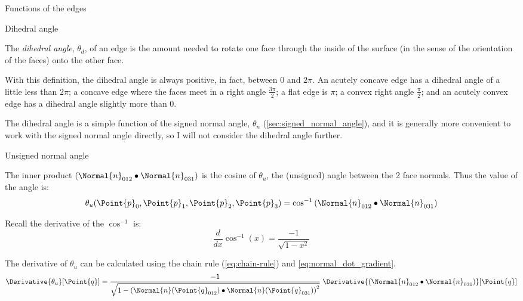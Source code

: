 \begin{plSection}{Functions of the edges}
\begin{plSection}{Dihedral angle}
\label{sec:Dihedral-angle}

The {\it dihedral angle},
$\theta_d$,
 of an edge is the amount
needed to rotate one face
through the inside of the surface
(in the sense of the orientation of the faces)
onto the other face.

With this definition, the dihedral angle is always
positive, in fact, between $0$ and $2\pi$.
An acutely concave edge has a dihedral angle
of a little less than $2\pi$;
a concave edge where the faces meet in a right angle
$\frac{3\pi}{2}$;
a flat edge is $\pi$;
a convex right angle $\frac{\pi}{2}$;
and an acutely convex edge has a dihedral angle
slightly more than $0$.

The dihedral angle is a simple function of the
signed normal angle, $\theta_n$
(\cref{sec:signed_normal_angle}),
and it is generally more convenient to work
with the signed normal angle directly,
so I will not consider the dihedral angle further.

\end{plSection}%

\begin{plSection}{Unsigned normal angle}
\label{sec:unsigned_normal_angle}

The inner product 
$\left( \Normal{n}_{012} \bullet \Normal{n}_{031} \right)$
is the cosine of $\theta_u$,
the (unsigned) angle between the 2 face normals.
Thus the value of the angle is:
\begin{equation}
\theta_u(\Point{p}_0,\Point{p}_1,\Point{p}_2,\Point{p}_3)
= \cos^{-1} \left( \Normal{n}_{012} \bullet \Normal{n}_{031} \right)
\end{equation}

Recall the derivative of the $\cos^{-1}$ is:
\begin{equation}
\frac{d}{\mathit dx} \cos^{-1}(x) = \frac{-1}{\sqrt{1-x^2}}
\end{equation}

The derivative of $\theta_u$ can be calculated using the chain rule
(\cref{eq:chain-rule}) and \cref{eq:normal_dot_gradient}.
\begin{equation}
\Derivative{\theta_u}[\Point{q}]
 = \frac{-1}
{
\sqrt{
1-
\left(
\Normal{n}(\Point{q}_{012}) \bullet \Normal{n}(\Point{q}_{031}) 
\right)^2
} 
}
\; \Derivative{\left( \Normal{n}_{012} \bullet \Normal{n}_{031} \right)}[\Point{q}]
\end{equation}


\end{plSection}
\end{plSection}
